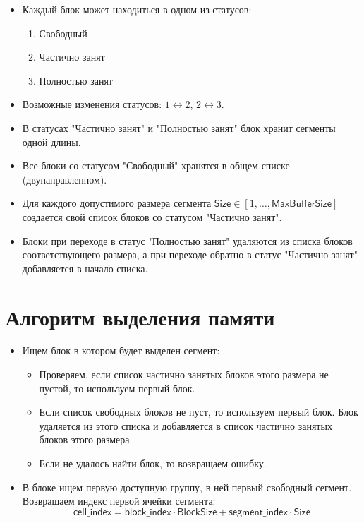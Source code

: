 \documentclass[12pt, a4paper]{article}
\begin{document}
	\begin{itemize}
		\item Каждый блок может находиться в одном из статусов:
			\begin{enumerate}
				\item Свободный
				\item Частично занят
				\item Полностью занят
			\end{enumerate}
		
		\item Возможные изменения статусов: $1 \leftrightarrow 2 $, $2 \leftrightarrow 3 $.
		
		\item В статусах "Частично занят" и "Полностью занят" блок хранит сегменты одной длины.
		
		\item Все блоки со статусом "Свободный" хранятся в общем списке (двунаправленном).
		
		\item Для каждого допустимого размера сегмента 
		$\textsf{Size} \in \left[ 1,\ldots ,\textsf{MaxBufferSize}\right] $ создается свой список блоков
		со статусом "Частично занят".
		
		\item Блоки при переходе в статус "Полностью занят" удаляются из списка блоков соответствующего размера,
		а при переходе обратно в статус "Частично занят" добавляется в начало списка.
		
	\end{itemize}

	\section{Алгоритм выделения памяти}
	
	\begin{itemize}
		\item Ищем блок в котором будет выделен сегмент:
			\begin{itemize}
				\item Проверяем, если список частично занятых блоков этого размера не пустой,
				то используем первый блок.
				\item Если список свободных блоков не пуст, то используем первый блок. Блок удаляется
				из этого списка и добавляется в список частично занятых блоков этого размера.
				\item Если не удалось найти блок, то возвращаем ошибку.
			\end{itemize}
		
		\item В блоке ищем первую доступную группу, в ней первый свободный сегмент. Возвращаем
		индекс первой ячейки сегмента:
		$$ \textsf{cell\_index} = \textsf{block\_index} \cdot \textsf{BlockSize} + 
		\textsf{segment\_index} \cdot \textsf{Size} $$
	
	\end{itemize}
\end{document}
